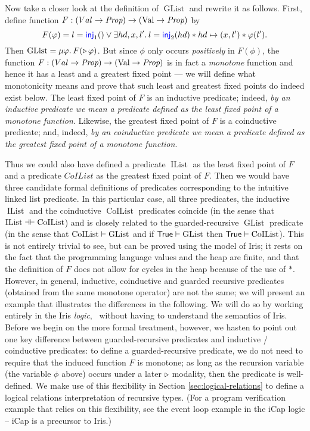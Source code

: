 Now take a closer look at the definition of $\operatorname{GList}$ and rewrite it as follows.
First, define function $F: (Val\to\textit{Prop})\to(\text{Val}\to\textit{Prop})$ by
\begin{displaymath}
  F(\phi) =
  l = \langkw{inj}_1() \lor  \Exists hd, x, l'. l = \langkw{inj}_2(hd) * hd \pointsto (x,l') * \phi(l').
\end{displaymath}
Then $\operatorname{GList} = \MU \phi. F(\later \phi)$.
But since $\phi$ only occurs \emph{positively} 
in $F(\phi)$, the function $F: (Val\to\textit{Prop})\to(\text{Val}\to\textit{Prop})$ is in fact a \emph{monotone} function and
hence it has a least and a greatest fixed point --- we will define what monotonicity means and
prove that such least and greatest fixed points do indeed exist below.
The least fixed point of $F$ is an inductive predicate; indeed, \emph{by an inductive predicate we mean
a predicate defined as the least fixed point of a monotone function}. 
Likewise, the greatest fixed point of $F$ is a coinductive predicate; and, indeed, \emph{by an coinductive predicate we mean
  a predicate defined as the greatest fixed point of a monotone function}.

Thus we could also have defined a predicate $\operatorname{IList}$ as the least fixed point of $F$
and a predicate $CoIList$ as the greatest fixed point of $F$. Then we would have
three candidate formal definitions of predicates corresponding to the intuitive linked list predicate.
In this particular case, all three predicates, the inductive
$\operatorname{IList}$ and the coinductive $\operatorname{CoIList}$ predicates coincide
(in the sense that $\operatorname{IList} \mathrel{\dashv\vdash} \operatorname{CoIList}$) and
is closely related to the guarded-recursive $\operatorname{GList}$ predicate
(in the sense that $\operatorname{CoIList} \vdash \operatorname{GList}$ and
if $\textsf{\upshape True}\vdash\operatorname{GList}$ then $\textsf{\upshape True}\vdash\operatorname{CoIList}$).
This is not entirely trivial to see, but can be proved using the model of Iris;
it rests on the fact that the programming language values and the heap are finite, and
that the definition of $F$ does not allow for cycles in the heap because of the use of $*$.
However, in general, inductive, coinductive and guarded recursive predicates (obtained from the
same monotone operator) are not the same; we will present an example that illustrates the
differences in the following. We will do so by working entirely in the Iris \emph{logic}, \ie\ without
having to understand the semantics of Iris.
Before we begin on the more formal treatment, however, we hasten to point out one key difference between guarded-recursive
predicates and inductive / coinductive predicates: to define a guarded-recursive predicate, we do not
need to require that the induced function $F$ is monotone; as long as the recursion variable (the variable $\phi$ above)
occurs under a later $\mathop{{\triangleright}}$ modality, then the predicate is well-defined.
We make use of this flexibility in Section \ref{sec:logical-relations} to define a logical relations interpretation
of recursive types. (For a program verification example that relies on this flexibility, see
the event loop example in the iCap logic \cite{icap} -- iCap is a precursor to Iris.)

